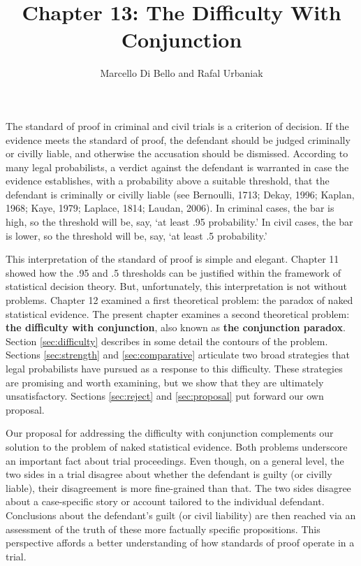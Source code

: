 \documentclass[
  10pt,
  dvipsnames,enabledeprecatedfontcommands]{scrartcl}
\title{Chapter 13: The Difficulty With Conjunction}
\author{Marcello Di Bello and Rafal Urbaniak}
\date{}
\begin{document}
\maketitle

The standard of proof in criminal and civil trials is a criterion of
decision. If the evidence meets the standard of proof, the defendant
should be judged criminally or civilly liable, and otherwise the
accusation should be dismissed. According to many legal probabilists, a
verdict against the defendant is warranted in case the evidence
establishes, with a probability above a suitable threshold, that the
defendant is criminally or civilly liable (see Bernoulli, 1713; Dekay,
1996; Kaplan, 1968; Kaye, 1979; Laplace, 1814; Laudan, 2006). In
criminal cases, the bar is high, so the threshold will be, say, `at
least .95 probability.' In civil cases, the bar is lower, so the
threshold will be, say, `at least .5 probability.'

This interpretation of the standard of proof is simple and elegant.
Chapter 11 showed how the .95 and .5 thresholds can be justified within
the framework of statistical decision theory. But, unfortunately, this
interpretation is not without problems. Chapter 12 examined a first
theoretical problem: the paradox of naked statistical evidence. The
present chapter examines a second theoretical problem:
\textbf{the difficulty with conjunction}, also known as
\textbf{the conjunction paradox}. Section \ref{sec:difficulty} describes
in some detail the contours of the problem. Sections \ref{sec:strength}
and \ref{sec:comparative} articulate two broad strategies that legal
probabilists have pursued as a response to this difficulty. These
strategies are promising and worth examining, but we show that they are
ultimately unsatisfactory. Sections \ref{sec:reject} and
\ref{sec:proposal} put forward our own proposal.

Our proposal for addressing the difficulty with conjunction complements
our solution to the problem of naked statistical evidence. Both problems
underscore an important fact about trial proceedings. Even though, on a
general level, the two sides in a trial disagree about whether the
defendant is guilty (or civilly liable), their disagreement is more
fine-grained than that. The two sides disagree about a case-specific
story or account tailored to the individual defendant. Conclusions about
the defendant's guilt (or civil liability) are then reached via an
assessment of the truth of these more factually specific propositions.
This perspective affords a better understanding of how standards of
proof operate in a trial.
\end{document}
